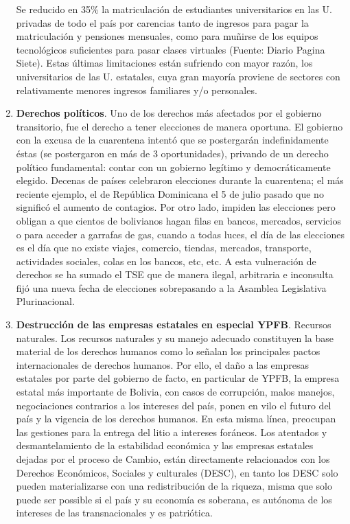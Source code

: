 \documentclass[a4paper, nobind]{templates/ociamthesis}
\begin{document}
\begin{enumerate}
  Se reducido en 35\% la matriculación de estudiantes universitarios en las U. privadas de todo el país por carencias tanto de ingresos para pagar la matriculación y pensiones mensuales, como para muñirse de los equipos tecnológicos suficientes para pasar clases virtuales (Fuente: Diario Pagina Siete). Estas últimas limitaciones están sufriendo con mayor razón, los universitarios de las U. estatales, cuya gran mayoría proviene de sectores con relativamente menores ingresos familiares y/o personales.
\item
  \textbf{Derechos políticos}. Uno de los derechos más afectados por el gobierno transitorio, fue el derecho a tener elecciones de manera oportuna. El gobierno con la excusa de la cuarentena intentó que se postergarán indefinidamente éstas (se postergaron en más de 3 oportunidades), privando de un derecho político fundamental: contar con un gobierno legítimo y democráticamente elegido. Decenas de países celebraron elecciones durante la cuarentena; el más reciente ejemplo, el de República Dominicana el 5 de julio pasado que no significó el aumento de contagios. Por otro lado, impiden las elecciones pero obligan a que cientos de bolivianos hagan filas en bancos, mercados, servicios o para acceder a garrafas de gas, cuando a todas luces, el día de las elecciones es el día que no existe viajes, comercio, tiendas, mercados, transporte, actividades sociales, colas en los bancos, etc, etc. A esta vulneración de derechos se ha sumado el TSE que de manera ilegal, arbitraria e inconsulta fijó una nueva fecha de elecciones sobrepasando a la Asamblea Legislativa Plurinacional.
\item
  \textbf{Destrucción de las empresas estatales en especial YPFB}. Recursos naturales. Los recursos naturales y su manejo adecuado constituyen la base material de los derechos humanos como lo señalan los principales pactos internacionales de derechos humanos. Por ello, el daño a las empresas estatales por parte del gobierno de facto, en particular de YPFB, la empresa estatal más importante de Bolivia, con casos de corrupción, malos manejos, negociaciones contrarios a los intereses del país, ponen en vilo el futuro del país y la vigencia de los derechos humanos. En esta misma línea, preocupan las gestiones para la entrega del litio a intereses foráneos. Los atentados y desmantelamiento de la estabilidad económica y las empresas estatales dejadas por el proceso de Cambio, están directamente relacionados con los Derechos Económicos, Sociales y culturales (DESC), en tanto los DESC solo pueden materializarse con una redistribución de la riqueza, misma que solo puede ser possible si el país y su economía es soberana, es autónoma de los intereses de las transnacionales y es patriótica.

\end{enumerate}
\end{document}
